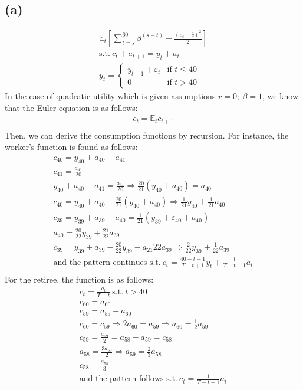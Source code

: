 \documentclass[10pt,a4paper]{article}
\newcommand{\sumtb}{\sum\limits_{t=s}^{60}}
\begin{document}
    \subsection*{(a)}
      \begin{gather*}
          \mathbb{E}_t[\sumtb\beta^{(s-t)} -\frac{(c_s-\bar{c})^2}{2}] \\
          \text{s.t.} \ c_t + a_{t+1} = y_t + a_t \\
          y_t = \begin{cases} 
          y_{t-1} + \varepsilon_t & \text{if } t \leq 40 \\
          0 & \text{if } t > 40 
          \end{cases}
      \end{gather*}
      In the case of quadratic utility which is given assumptions $r=0; \ \beta=1$, we know that the
      Euler equation is as follows:
      \begin{gather*}
          c_t = \mathbb{E}_tc_{t+1} \\
      \end{gather*}
      Then, we can derive the consumption functions by recursion. For instance, the worker's function is found as follows:
      \begin{gather*}
        c_{40} = y_{40} + a_{40} - a_{41} \\
        c_{41} = \frac{a_{41}}{20} \\
        y_{40} + a_{40} - a_{41} = \frac{a_{41}}{20} \Rightarrow \frac{20}{21}(y_{40}+a_{40}) = a_{40} \\
        c_{40} = y_{40} + a_{40} - \frac{20}{21}(y_{40}+a_{40}) \Rightarrow \frac{1}{21}y_{40} + \frac{1}{21}a_{40} \\
        c_{39} = y_{39} + a_{39} - a_{40} = \frac{1}{21}(y_{39} + \varepsilon_{40} + a_{40}) \\
        a_{40} = \frac{20}{22}y_{39} + \frac{21}{22}a_{39} \\
        c_{39} = y_{39} + a_{39} - \frac{20}{22}y_{39} - a_{21}{22}a_{39} \Rightarrow \frac{2}{22}y_{39} + \frac{1}{22}a_{39} \\
        \text{and the pattern continues s.t.} \ c_t = \frac{40-t+1}{T-t+1}y_t + \frac{1}{T-t+1}a_t \\
      \end{gather*}
      For the retiree. the function is as follows:
      \begin{gather*}
        c_t = \frac{a_t}{T-t} \ \text{s.t.} \ t > 40  \\
        c_{60} = a_{60} \\
        c_{59} = a_{59}-a_{60} \\
        c_{60} = c_{59} \Rightarrow 2a_{60} = a_{59} \Rightarrow a_{60} = \frac{1}{2}a_{59} \\
        c_{59} = \frac{a_{59}}{2} = a_{58} - a_{59} = c_{58} \\
        a_{58} = \frac{3a_{59}}{2} \Rightarrow a_{59} = \frac{2}{3}a_{58} \\
        c_{58} = \frac{a_{58}}{3} \\
        \text{and the pattern follows s.t.} \ c_{t} = \frac{1}{T-t+1}a_t
      \end{gather*}
\end{document}

